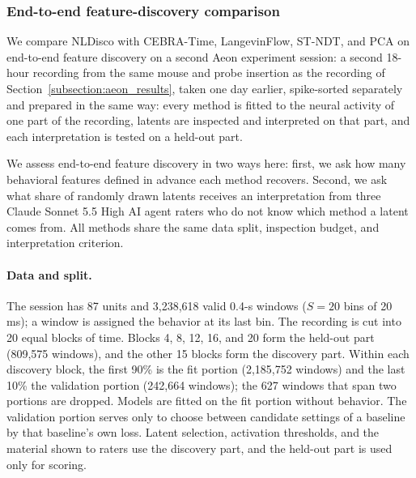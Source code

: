 \subsubsection{End-to-end feature-discovery comparison}
\label{subsubsection:rebuttal_discovery_comparison}

We compare NLDisco with CEBRA-Time, LangevinFlow, ST-NDT, and PCA on end-to-end feature discovery on a second Aeon experiment session: a second 18-hour recording from the same mouse and probe insertion as the recording of Section~\ref{subsection:aeon_results}, taken one day earlier, spike-sorted separately and prepared in the same way: every method is fitted to the neural activity of one part of the recording, latents are inspected and interpreted on that part, and each interpretation is tested on a held-out part. 

We assess end-to-end feature discovery in two ways here: first, we ask how many behavioral features defined in advance each method recovers. Second, we ask what share of randomly drawn latents receives an interpretation from three Claude Sonnet 5.5 High AI agent raters who do not know which method a latent comes from. All methods share the same data split, inspection budget, and interpretation criterion.

\paragraph{Data and split.}
The session has 87 units and 3,238,618 valid 0.4-s windows ($S=20$ bins of 20 ms); a window is assigned the behavior at its last bin. The recording is cut into 20 equal blocks of time. Blocks 4, 8, 12, 16, and 20 form the held-out part (809,575 windows), and the other 15 blocks form the discovery part. Within each discovery block, the first 90\% is the fit portion (2,185,752 windows) and the last 10\% the validation portion (242,664 windows); the 627 windows that span two portions are dropped. Models are fitted on the fit portion without behavior. The validation portion serves only to choose between candidate settings of a baseline by that baseline's own loss. Latent selection, activation thresholds, and the material shown to raters use the discovery part, and the held-out part is used only for scoring.

